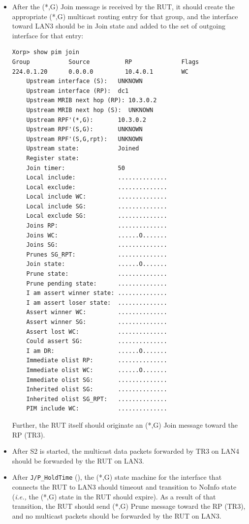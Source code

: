 \documentclass[11pt]{report}
\newcommand{\ie}{\emph{i.e.,}\xspace}
\begin{document}
\begin{itemize}

  \item After the (*,G) Join message is received by the RUT, it
  should create the appropriate (*,G) multicast routing entry for
  that group, and the interface toward LAN3 should be in Join state and
  added to the set of outgoing interface for that entry:

\begin{verbatim}
Xorp> show pim join 
Group           Source          RP              Flags
224.0.1.20      0.0.0.0         10.4.0.1        WC   
    Upstream interface (S):   UNKNOWN
    Upstream interface (RP):  dc1
    Upstream MRIB next hop (RP): 10.3.0.2
    Upstream MRIB next hop (S):  UNKNOWN
    Upstream RPF'(*,G):       10.3.0.2
    Upstream RPF'(S,G):       UNKNOWN
    Upstream RPF'(S,G,rpt):   UNKNOWN
    Upstream state:           Joined 
    Register state:           
    Join timer:               50
    Local include:            ..............
    Local exclude:            ..............
    Local include WC:         ..............
    Local include SG:         ..............
    Local exclude SG:         ..............
    Joins RP:                 ..............
    Joins WC:                 ......O.......
    Joins SG:                 ..............
    Prunes SG_RPT:            ..............
    Join state:               ......O.......
    Prune state:              ..............
    Prune pending state:      ..............
    I am assert winner state: ..............
    I am assert loser state:  ..............
    Assert winner WC:         ..............
    Assert winner SG:         ..............
    Assert lost WC:           ..............
    Could assert SG:          ..............
    I am DR:                  ......O.......
    Immediate olist RP:       ..............
    Immediate olist WC:       ......O.......
    Immediate olist SG:       ..............
    Inherited olist SG:       ..............
    Inherited olist SG_RPT:   ..............
    PIM include WC:           ..............
\end{verbatim}

  Further, the RUT itself should originate an (*,G) Join message
  toward the RP (TR3).

  \item After S2 is started, the multicast data packets forwarded by TR3
  on LAN4 should be forwarded by the RUT on LAN3.

  \item After \verb=J/P_HoldTime= ({\PimsmJPHoldTime}),
  the (*,G) state machine for the interface that connects the RUT to
  LAN3 should timeout and transition to NoInfo state
  (\ie the (*,G) state in the RUT should expire).
  As a result of that transition, the RUT should send (*,G) Prune
  message toward the RP (TR3), and no multicast packets should be
  forwarded by the RUT on LAN3.

\end{itemize}
\end{document}
